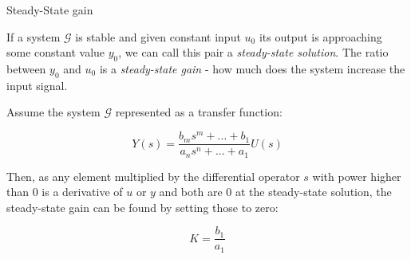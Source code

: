 \documentclass{beamer}
\begin{document}
\begin{frame}{Steady-State gain}
	\begin{flushleft}
		
		If a system  $\mathcal{G}$ is stable and given constant input $u_0$ its output is approaching some constant value $y_0$, we can call this pair a \emph{steady-state solution}. The ratio between $y_0$ and $u_0$ is a \emph{steady-state gain} - how much does the system increase the input signal.
		
		Assume the system  $\mathcal{G}$ represented as a transfer function:
		
		\begin{equation}
			Y(s) = \frac{b_m s^m + ... + b_1}{a_n s^n + ... + a_1} U(s)
		\end{equation}
		
		Then, as any element multiplied by the differential operator $s$ with power higher than 0 is a derivative of $u$ or $y$ and both are 0 at the steady-state solution, the steady-state gain can be found by setting those to zero:
		
		\begin{equation}
			K = \frac{b_1}{a_1}
		\end{equation}		
		
		
		
	\end{flushleft}
\end{frame}
\end{document}
